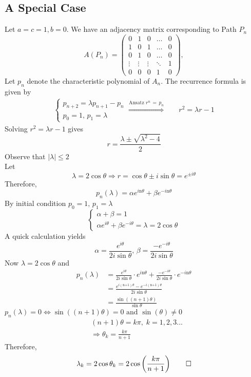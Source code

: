 \documentclass[11pt]{article}
\begin{document}
\subsection{A Special Case}
Let $a=c=1, b=0$. We have an adjacency matrix corresponding to Path $P_n$
\[
    A(P_n)=
    \begin{pmatrix}
    0 & 1 & 0 & \dots & 0\\
    1 & 0 & 1 & \dots & 0\\
    0 & 1 & 0 & \dots & 0\\
    \vdots & \vdots & \vdots & \ddots & 1\\
    0 & 0 & 0 & 1 & 0
    \end{pmatrix},
\]
Let $p_n$ denote the characteristic polynomial of $A_n$. The recurrence formula is given by
\begin{align*}
    \begin{cases}
        p_{n+2} = \lambda p_{n+1} - p_n\\
        p_0 = 1, \,p_1 = \lambda
    \end{cases}
    \overset{\text{Ansatz } r^n\,=\,p_n}{\Rightarrow}
    \quad
    &r^2 = \lambda r - 1
\end{align*}
Solving $r^2 = \lambda r - 1$ gives 
\[
    r = \frac{\lambda \pm \sqrt{\lambda^2-4}}{2}
\]
Observe that $|\lambda|\leq 2$\\
Let 
\[
    \lambda = 2\cos\theta \Rightarrow r=\cos\theta \pm i\sin\theta = e^{\pm i\theta}
\]
Therefore,
\[
    p_n(\lambda)=\alpha e^{i\text{n}\theta} + \beta e^{-i\text{n}\theta}
\]
By initial condition $p_0 = 1, \,p_1=\lambda$
\[
    \begin{cases}
        \alpha + \beta = 1\\[.5em]
        \alpha e^{i\theta} + \beta e^{-i\theta}=\lambda=2\cos\theta
    \end{cases}
\]
A quick calculation yields
\[
    \alpha = \frac{e^{i\theta}}{2i\sin\theta},\,\beta = \frac{-e^{-i\theta}}{2i\sin\theta}
\]
Now $\lambda = 2\cos\theta$ and
\[
    \begin{split}
        p_n(\lambda)&=\frac{e^{i\theta}}{2i\sin\theta}\cdot e^{i\text{n}\theta} + \frac{-e^{-i\theta}}{2i\sin\theta}\cdot e^{-i\text{n}\theta}\\[.5em]
        &=\frac{e^{i(\text{n+1})\theta}-e^{-i(\text{n+1})\theta}}{2i\sin\theta}\\[.5em]
        &=\frac{\sin((n+1)\theta)}{\sin\theta}
    \end{split}
\]
$p_n(\lambda) = 0 \Leftrightarrow \sin\left((n+1)\theta\right) = 0\text{ and }\sin(\theta) \neq 0$
\[
    \begin{split}
        &(n+1)\theta = k\pi, \;k = 1,2,3...\\
        &\Rightarrow\theta_k = \frac{k\pi}{n+1}
    \end{split}
\]
Therefore,
\[
    \lambda_k = 2\cos\theta_k= 2\cos\left(\frac{k\pi}{n+1}\right)\qed
\]
\end{document}
